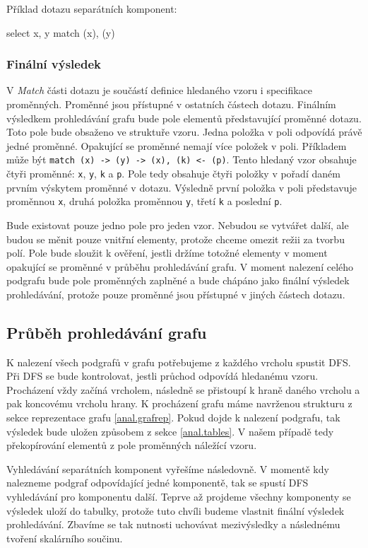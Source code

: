 Příklad dotazu separátních komponent:
\begin{code}
select x, y match (x), (y)
\end{code}

\subsubsection{Finální výsledek}

V \textit{Match} části dotazu je součástí definice hledaného vzoru i specifikace proměnných.
Proměnné jsou přístupné v ostatních částech dotazu.
Finálním výsledkem prohledávání grafu bude pole elementů představující proměnné dotazu.
Toto pole bude obsaženo ve struktuře vzoru.
Jedna položka v poli odpovídá právě jedné proměnné.
Opakující se proměnné nemají více položek v poli.
Příkladem může být \texttt{match (x) -> (y) -> (x), (k) <- (p)}.
Tento hledaný vzor obsahuje čtyři proměnné: \texttt{x}, \texttt{y}, \texttt{k} a \texttt{p}.
Pole tedy obsahuje čtyři položky v pořadí daném prvním výskytem proměnné v dotazu.
Výsledně první položka v poli představuje proměnnou \texttt{x}, druhá položka proměnnou \texttt{y}, třetí \texttt{k} a poslední \texttt{p}.

Bude existovat pouze jedno pole pro jeden vzor. 
Nebudou se vytvářet další, ale budou se měnit pouze vnitřní elementy, protože chceme omezit režii za tvorbu polí.
Pole bude sloužit k ověření, jestli držíme totožné elementy v moment opakující se proměnné v průběhu prohledávání grafu.
V moment nalezení celého podgrafu bude pole proměnných zaplněné a bude chápáno jako finální výsledek prohledávání, protože pouze proměnné jsou přístupné v jiných částech dotazu.

\subsection{Průběh prohledávání grafu}

K nalezení všech podgrafů v grafu potřebujeme z každého vrcholu spustit DFS.
Při DFS se bude kontrolovat, jestli průchod odpovídá hledanému vzoru.
Procházení vždy začíná vrcholem, následně se přistoupí k hraně daného vrcholu a pak koncovému vrcholu hrany. 
K procházení grafu máme navrženou strukturu z sekce reprezentace grafu \ref{anal.grafrep}.
Pokud dojde k nalezení podgrafu, tak výsledek bude uložen způsobem z sekce \ref{anal.tables}.
V našem případě tedy překopírování elementů z pole proměnných náležící vzoru.

Vyhledávání separátních komponent vyřešíme následovně.
V momentě kdy nalezneme podgraf odpovídající jedné komponentě, tak se spustí DFS vyhledávání pro komponentu další.
Teprve až projdeme všechny komponenty se výsledek uloží do tabulky, protože tuto chvíli budeme vlastnit finální výsledek prohledávání.
Zbavíme se tak nutnosti uchovávat mezivýsledky a následnému tvoření skalárního součinu.

